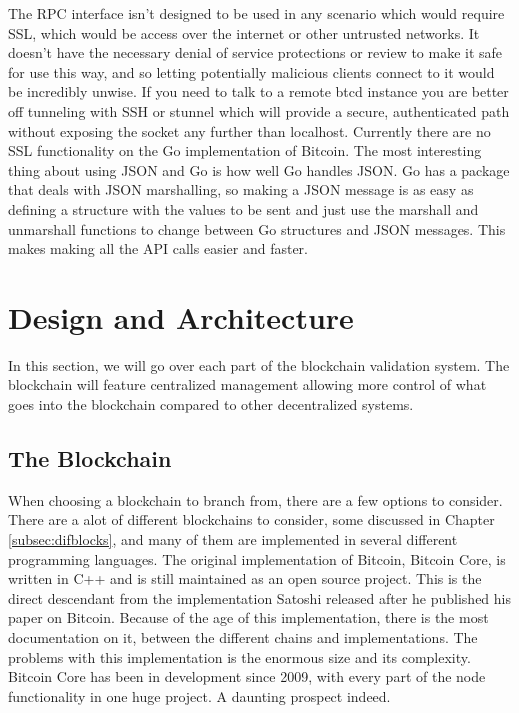 \documentclass[12pt]{article}
\begin{document}
The RPC interface isn't designed to be used in any scenario which would require SSL, which would be access over the internet or other untrusted networks. It doesn't have the necessary denial of service protections or review to make it safe for use this way, and so letting potentially malicious clients connect to it would be incredibly unwise. If you need to talk to a remote btcd instance you are better off tunneling with SSH or stunnel which will provide a secure, authenticated path without exposing the socket any further than localhost. Currently there are no SSL functionality on the Go implementation of Bitcoin. The most interesting thing about using JSON and Go is how well Go handles JSON. Go has a package that deals with JSON marshalling, so making a JSON message is as easy as defining a structure with the values to be sent and just use the marshall and unmarshall functions to change between Go structures and JSON messages. This makes making all the API calls easier and faster.

\section{Design and Architecture}

In this section, we will go over each part of the blockchain validation system. The blockchain will feature centralized management allowing more control of what goes into the blockchain compared to other decentralized systems.

\subsection{The Blockchain}

When choosing a blockchain to branch from, there are a few options to consider. There are a alot of different blockchains to consider, some discussed in Chapter \ref{subsec:difblocks}, and many of them are implemented in several different programming languages. The original implementation of Bitcoin, Bitcoin Core, is written in C++ and is still maintained as an open source project. This is the direct descendant from the implementation Satoshi released after he published his paper on Bitcoin. Because of the age of this implementation, there is the most documentation on it, between the different chains and implementations. The problems with this implementation is the enormous size and its complexity. Bitcoin Core has been in development since 2009, with every part of the node functionality in one huge project. A daunting prospect indeed.
\end{document}
